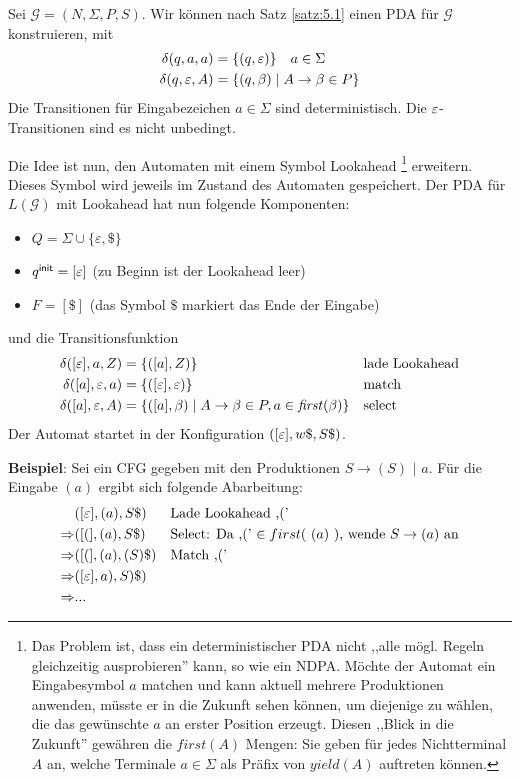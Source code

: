 {Sei $\mathcal{G} = (N, \Sigma, P, S)$.
Wir können nach Satz \ref{satz:5.1} einen PDA für $\mathcal{G}$ konstruieren, mit
\begin{align*}
  \delta(q, a, a) &= \{(q, \varepsilon)\} \quad a \in \Sigma \\
  \delta(q, \varepsilon, A) &= \{(q, \beta)  \mid A \to \beta \in P\}
\end{align*}
Die Transitionen für Eingabezeichen $a \in \Sigma$ sind deterministisch.
Die $\varepsilon$-Transitionen sind es nicht unbedingt.

Die Idee ist nun, den Automaten mit einem Symbol Lookahead \footnote{Das Problem ist, dass ein deterministischer PDA nicht ,,alle mögl. Regeln gleichzeitig ausprobieren'' kann, so wie ein NDPA. Möchte der Automat ein Eingabesymbol $a$ matchen und kann aktuell mehrere Produktionen anwenden, müsste er in die Zukunft sehen können, um diejenige zu wählen, die das gewünschte $a$ an erster Position erzeugt. Diesen ,,Blick in die Zukunft'' gewähren die $first(A)$ Mengen: Sie geben für jedes Nichtterminal $A$ an, welche Terminale $a \in \Sigma$ als Präfix von $yield(A)$ auftreten können.} 
erweitern. Dieses Symbol wird jeweils im Zustand des Automaten
gespeichert. Der PDA für $L (\mathcal{G})$ mit Lookahead hat nun
folgende Komponenten:
\begin{itemize}
\item $Q = \Sigma\cup \{\varepsilon, \$\}$
\item $q^\mathsf{init} = [\varepsilon]$ (zu Beginn ist der Lookahead leer)
\item $F = [\$]$  (das Symbol $\$$ markiert das Ende der Eingabe)
\end{itemize}
und die Transitionsfunktion
\begin{align*}
  \delta ([\varepsilon], a, Z) & = \{([a], Z) \} & & \text{lade Lookahead} \\
  \delta ([a], \varepsilon, a) & = \{([\varepsilon], \varepsilon) \} && \text{match}
  \\
  \delta ([a], \varepsilon, A) & = \{([a], \beta) \mid A\to\beta\in P, a \in
  \mathit{first} (\beta) \} && \text{select}
\end{align*}
Der Automat startet in der Konfiguration $([\varepsilon], w\$, S\$)$.

\textbf{Beispiel}: Sei ein CFG gegeben mit den Produktionen $S \to ( S )$ $ |$ $ a$. Für die Eingabe $(a)$ ergibt sich folgende Abarbeitung:
\begin{align*}
              & ([\varepsilon], (a), S\$ )   && \text{Lade Lookahead ,('}\\
  \Rightarrow & ([(], (a), S\$ )   && \text{Select: Da ,(' $\in first($ $(a)$ $ )$, wende $S \to (a)$ an}\\
  \Rightarrow & ([(], (a), (S)\$ ) && \text{Match ,('}\\
  \Rightarrow & ([\varepsilon], a), S)\$) \\
  \Rightarrow & ...
\end{align*}

}
